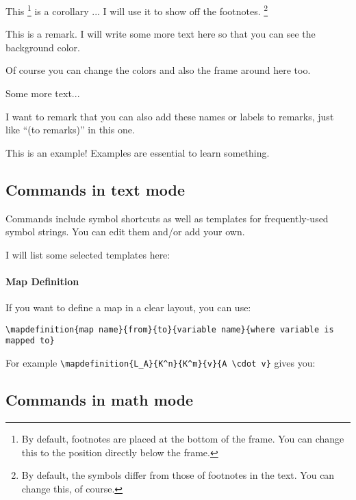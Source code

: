 \begin{corollary}
  This \footnote{By default, footnotes are placed at the bottom of the frame. You can change this to the position directly below the frame.} is a corollary ...
  I will use it to show off the footnotes. \footnote{By default, the symbols differ from those of footnotes in the text. You can change this, of course.}
\end{corollary}

\begin{remark}
  This is a remark. I will write some more text here so that you can see the background color.

  Of course you can change the colors and also the frame around here too.

  Some more text...
\end{remark}

\begin{remark}[to remarks]
  I want to remark that you can also add these names or labels to remarks, just like ``(to remarks)'' in this one.
\end{remark}

\begin{example}
  This is an example! Examples are essential to learn something.
\end{example}

\subsection{Commands in text mode}

Commands include symbol shortcuts as well as templates for frequently-used symbol strings. You can edit them and/or add your own.

I will list some selected templates here:

\paragraph{Map Definition}

If you want to define a map in a clear layout, you can use:
\begin{center}\verb|\mapdefinition{map name}{from}{to}{variable name}{where variable is mapped to}|\end{center}
For example \verb|\mapdefinition{L_A}{K^n}{K^m}{v}{A \cdot v}| gives you:

\subsection{Commands in math mode}

